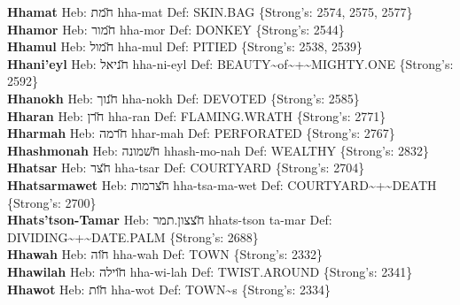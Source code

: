 {\textbf{Hhamat} Heb: {\large\H חמת} hha-mat Def: SKIN.BAG \{Strong's: 2574, 2575, 2577\}\hfill{}\\

\textbf{Hhamor} Heb: {\large\H חמור} hha-mor Def: DONKEY \{Strong's: 2544\}\hfill{}\\

\textbf{Hhamul} Heb: {\large\H חמול} hha-mul Def: PITIED \{Strong's: 2538, 2539\}\hfill{}\\

\textbf{Hhani'eyl} Heb: {\large\H חניאל} hha-ni-eyl Def: BEAUTY\textasciitilde{}of\textasciitilde{}+\textasciitilde{}MIGHTY.ONE \{Strong's: 2592\}\hfill{}\\

\textbf{Hhanokh} Heb: {\large\H חנוך} hha-nokh Def: DEVOTED \{Strong's: 2585\}\hfill{}\\

\textbf{Hharan} Heb: {\large\H חרן} hha-ran Def: FLAMING.WRATH \{Strong's: 2771\}\hfill{}\\

\textbf{Hharmah} Heb: {\large\H חרמה} hhar-mah Def: PERFORATED \{Strong's: 2767\}\hfill{}\\

\textbf{Hhashmonah} Heb: {\large\H חשמונה} hhash-mo-nah Def: WEALTHY \{Strong's: 2832\}\hfill{}\\

\textbf{Hhatsar} Heb: {\large\H חצר} hha-tsar Def: COURTYARD \{Strong's: 2704\}\hfill{}\\

\textbf{Hhatsarmawet} Heb: {\large\H חצרמות} hha-tsa-ma-wet Def: COURTYARD\textasciitilde{}+\textasciitilde{}DEATH \{Strong's: 2700\}\hfill{}\\

\textbf{Hhats'tson-Tamar} Heb: {\large\H חצצון.תמר} hhats-tson ta-mar Def: DIVIDING\textasciitilde{}+\textasciitilde{}DATE.PALM \{Strong's: 2688\}\hfill{}\\

\textbf{Hhawah} Heb: {\large\H חוה} hha-wah Def: TOWN \{Strong's: 2332\}\hfill{}\\

\textbf{Hhawilah} Heb: {\large\H חוילה} hha-wi-lah Def: TWIST.AROUND \{Strong's: 2341\}\hfill{}\\

\textbf{Hhawot} Heb: {\large\H חות} hha-wot Def: TOWN\textasciitilde{}s \{Strong's: 2334\}\hfill{}\\

}
